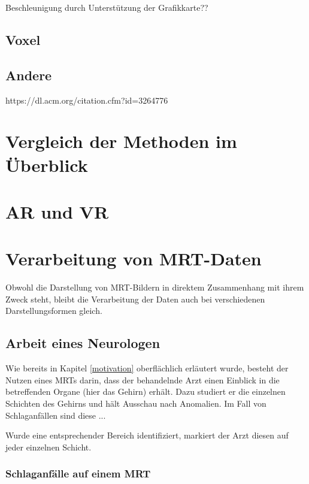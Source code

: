 Beschleunigung durch Unterstützung der Grafikkarte??


\subsection{Voxel}

\subsection{Andere}
https://dl.acm.org/citation.cfm?id=3264776


\section{Vergleich der Methoden im Überblick}											 %

\section{AR und VR}											 %

\section{Verarbeitung von MRT-Daten}						 %
Obwohl die Darstellung von MRT-Bildern in direktem Zusammenhang mit ihrem Zweck steht, bleibt die Verarbeitung der Daten auch bei verschiedenen Darstellungsformen gleich. 

\subsection{Arbeit eines Neurologen}
Wie bereits in Kapitel \ref{motivation} oberflächlich erläutert wurde, besteht der Nutzen eines MRTs darin, dass der behandelnde Arzt einen Einblick in die betreffenden Organe (hier das Gehirn) erhält. Dazu studiert er die einzelnen Schichten des Gehirns und hält Ausschau nach Anomalien.
Im Fall von Schlaganfällen sind diese ...

Wurde eine entsprechender Bereich identifiziert, markiert der Arzt diesen auf jeder einzelnen Schicht. 
\subsubsection{Schlaganfälle auf einem MRT}

